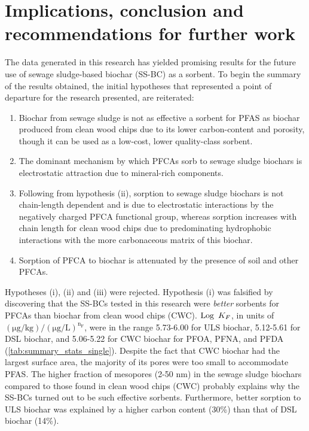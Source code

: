 \chapter{Implications, conclusion and recommendations for further work}\label{chap:Conclusion} 
The data generated in this research has yielded promising results for the future use of sewage sludge-based biochar (SS-BC) as a sorbent. To begin the summary of the results obtained, the initial hypotheses that represented a point of departure for the research presented, are reiterated:

\begin{enumerate}[label=\roman*]
    \item Biochar from sewage sludge is not as effective a sorbent for PFAS as biochar produced from clean wood chips due to its lower carbon-content and porosity, though it can be used as a low-cost, lower quality-class sorbent.
    \item The dominant mechanism by which PFCAs sorb to sewage sludge biochars is electrostatic attraction due to mineral-rich components. 
    \item Following from hypothesis (ii), sorption to sewage sludge biochars is not chain-length dependent and is due to electrostatic interactions by the negatively charged PFCA functional group, whereas sorption increases with chain length for clean wood chips due to predominating hydrophobic interactions with the more carbonaceous matrix of this biochar.
    \item Sorption of PFCA to biochar is attenuated by the presence of soil and other PFCAs. 
\end{enumerate}

Hypotheses (i), (ii) and (iii) were rejected. Hypothesis (i) was falsified by discovering that the SS-BCs tested in this research were \textit{better} sorbents for PFCAs than biochar from clean wood chips (CWC). $\operatorname{Log}~K_F$, in units of $\mathrm{(\mu g/kg)/(\mu g/L)^{n_F}}$, were in the range 5.73-6.00 for ULS biochar, 5.12-5.61 for DSL biochar, and 5.06-5.22 for CWC biochar for PFOA, PFNA, and PFDA (\cref{tab:summary_stats_single}). Despite the fact that CWC biochar had the largest surface area, the majority of its pores were too small to accommodate PFAS. The higher fraction of mesopores (2-50 nm) in the sewage sludge biochars compared to those found in clean wood chips (CWC) probably explains why the SS-BCs turned out to be such effective sorbents. Furthermore, better sorption to ULS biochar was explained by a higher carbon content (30\%) than that of DSL biochar (14\%).

